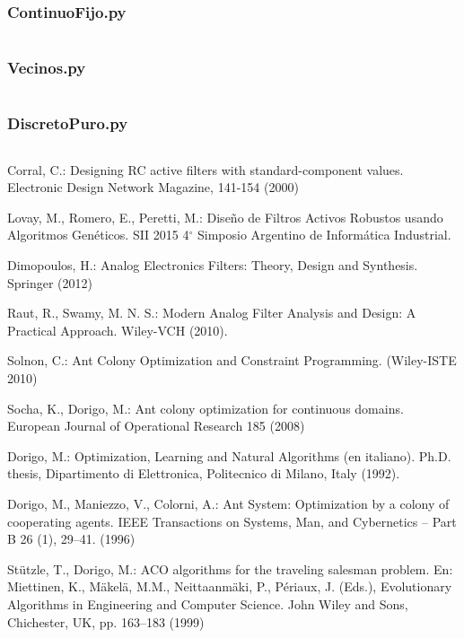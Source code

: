 \documentclass{llncs}
\begin{document}
	\subsubsection{ContinuoFijo.py}
	\inputminted{python}{ContinuoFijo.py}
	\subsubsection{Vecinos.py}
	\inputminted{python}{Vecinos.py}
	\subsubsection{DiscretoPuro.py}
	\inputminted{python}{DiscretoPuro.py}
	
  \begin{thebibliography}{1}
      Corral, C.: 
      Designing RC active filters with standard-component values. Electronic Design
      Network Magazine, 141-154 (2000)
      
      Lovay, M., Romero, E., Peretti, M.:
      Diseño de Filtros Activos Robustos usando Algoritmos Genéticos.
      SII 2015 4$^\circ$ Simposio Argentino de Informática Industrial.
      
      Dimopoulos, H.: 
      Analog Electronics Filters: Theory, Design and Synthesis. 
      Springer (2012)
      
      Raut, R., Swamy, M. N. S.: 
      Modern Analog Filter Analysis and Design: A Practical Approach. 
      Wiley-VCH (2010).
      
      Solnon, C.:
      Ant Colony Optimization and Constraint Programming. (Wiley-ISTE 2010) 
      
      Socha, K., Dorigo, M.:
      Ant colony optimization for continuous domains.
      European Journal of Operational Research 185 (2008)
      
      Dorigo, M.:
      Optimization, Learning and Natural Algorithms (en italiano). 
      Ph.D. thesis, Dipartimento di Elettronica, Politecnico di Milano, Italy (1992).
      
      Dorigo, M., Maniezzo, V., Colorni, A.: 
      Ant System: Optimization by a colony of cooperating agents. 
      IEEE Transactions on Systems, Man, and Cybernetics – Part B 26 (1), 29–41. (1996)
      
      Stützle, T., Dorigo, M.:
      ACO algorithms for the traveling salesman problem. 
      En: Miettinen, K., Mäkelä, M.M., Neittaanmäki, P., Périaux, J. (Eds.), Evolutionary Algorithms in
	  Engineering and Computer Science. John Wiley and Sons,
	  Chichester, UK, pp. 163–183 (1999)


\end{thebibliography}
\end{document}
